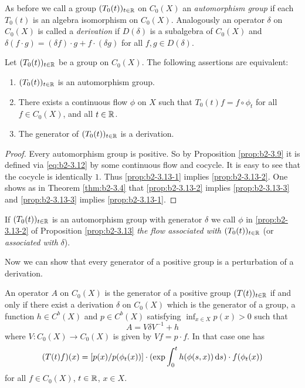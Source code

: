 As before we call a group $(T_{0}(t))_{t \in \mathbb{R}}$ on $C_{0}(X)$ an \emph{automorphism group} if each $T_{0}(t)$ is an algebra isomorphism on $C_{0}(X)$.
Analogously an operator $\delta$ on $C_{0}(X)$ is called a \emph{derivation} if $D(\delta)$ is a subalgebra of $C_{0}(X)$ and $\delta(f \cdot g) = (\delta f) \cdot g + f \cdot (\delta g)$ for all $f,g \in D(\delta)$.

\begin{proposition}\label{prop:b2-3.13}
Let $(T_{0}(t))_{t \in \mathbb{R}}$ be a group on $C_{0}(X)$.
The following assertions are equivalent:
\begin{enumerate}[\upshape (a)]
\item \label{prop:b2-3.13-1}
$(T_{0}(t))_{t \in \mathbb{R}}$ is an automorphism group.
\item \label{prop:b2-3.13-2}
There exists a continuous flow $\phi$ on $X$ such that $T_{0}(t)f = f \circ \phi_{t}$  for all \\
 $f \in C_{0}(X)$, and all $t \in \mathbb{R}$.
\item \label{prop:b2-3.13-3} 
The generator of $(T_{0}(t))_{t \in \mathbb{R}}$ is a derivation.
\end{enumerate}
\end{proposition}

\begin{proof}
Every automorphism group is positive.
So by Proposition \ref{prop:b2-3.9}  it is defined via \eqref{eq:b2-3.12} by some continuous flow and cocycle.
It is easy to see that the cocycle is identically $1$.
Thus \ref{prop:b2-3.13-1} implies \ref{prop:b2-3.13-2}.
One shows as in Theorem \ref{thm:b2-3.4}  that \ref{prop:b2-3.13-2} implies \ref{prop:b2-3.13-3} and \ref{prop:b2-3.13-3} implies \ref{prop:b2-3.13-1}.
\end{proof}

If $(T_{0}(t))_{t \in \mathbb{R}}$ is an automorphism group with generator $\delta$ we call $\phi$ in \ref{prop:b2-3.13-2} of Proposition \ref{prop:b2-3.13} \emph{the flow associated with} $(T_{0}(t))_{t \in \mathbb{R}}$ (or \emph{associated with} $\delta$).

Now we can show that every generator of a positive group is a perturbation of a derivation.
\begin{theorem}\label{thm:b2-3.14}
An operator $A$ on $C_{0}(X)$ is the generator of a positive group $(T(t))_{t \in \mathbb{R}}$ if and only if there exist a derivation $\delta$ on $C_{0}(X)$ which is the generator of a group, a function $h \in C^{b}(X)$ and $p \in C^{b}(X)$ satisfying $\inf_{x \in X} p(x) > 0$ such that
\begin{equation}\label{eq:b2-3.18}
A = V\delta V^{-1} + h
\end{equation}
where $V \colon C_{0}(X) \to C_{0}(X)$ is given by $Vf = p \cdot f$. In that case one has
\begin{equation}\label{eq:b2-3.19}
(T(t)f)(x) = [p(x)/p(\phi_{t}(x))] \cdot (\exp \int_{0}^{t} h(\phi(s,x)) \mathop{}\!\mathrm{d}{s}) \cdot f(\phi_{t}(x))
\end{equation}
for all $f \in C_{0}(X)$, $t \in \mathbb{R}$, $x \in X$.
\end{theorem}

